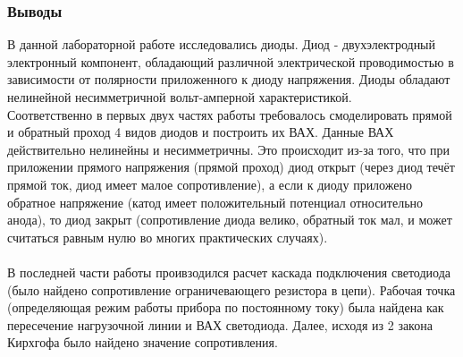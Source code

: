 \documentclass[12pt]{article}
\begin{document}
\subsubsection*{Выводы}
В данной лабораторной работе исследовались диоды. Диод - двухэлектродный электронный компонент, обладающий различной электрической проводимостью в зависимости от полярности приложенного к диоду напряжения. Диоды обладают нелинейной несимметричной вольт-амперной характеристикой. \\
Соответственно в первых двух частях работы требовалось смоделировать прямой и обратный проход 4 видов диодов и построить их ВАХ. Данные ВАХ действительно нелинейны и несимметричны. Это происходит из-за того, что при приложении прямого напряжения (прямой проход) диод открыт (через диод течёт прямой ток, диод имеет малое сопротивление), а если к диоду приложено обратное напряжение (катод имеет положительный потенциал относительно анода), то диод закрыт (сопротивление диода велико, обратный ток мал, и может считаться равным нулю во многих практических случаях). \\
\ \\
В последней части работы проивзодился расчет каскада подключения светодиода (было найдено сопротивление ограничевающего резистора в цепи). Рабочая точка (определяющая режим работы прибора по постоянному току) была найдена как пересечение нагрузочной линии и ВАХ светодиода. Далее, исходя из 2 закона Кирхгофа было найдено значение сопротивления.
\end{document}
